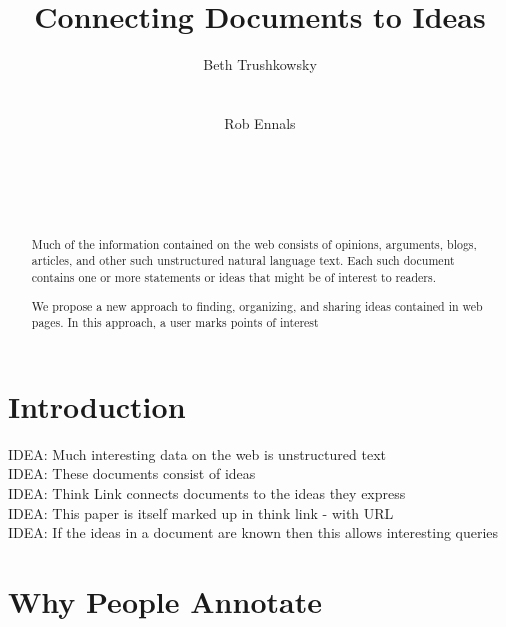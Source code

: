 \documentclass{sig-alt-release2}
\newcommand{\idea}[1]{{\color{blue} IDEA: #1}\\}
\begin{document}
%
\title{Connecting Documents to Ideas}


\author{
\alignauthor Beth Trushkowsky\\
       \\
       \\
\alignauthor Rob Ennals\\
       \\
       \\
       \\
       \\
}

\sloppy 

\maketitle

\begin{abstract}

Much of the information contained on the web consists of opinions, arguments, blogs, articles, and other such unstructured natural language text. Each such document contains one or more statements or ideas that might be of interest to readers.

We propose a new approach to finding, organizing, and sharing ideas contained in web pages. In this approach, a user marks points of interest 

\end{abstract}

\section{Introduction}

\idea{Much interesting data on the web is unstructured text}

\idea{These documents consist of ideas}

\idea{Think Link connects documents to the ideas they express}

\idea{This paper is itself marked up in think link - with URL}

\idea{If the ideas in a document are known then this allows interesting queries}


\section{Why People Annotate}
\end{document}
